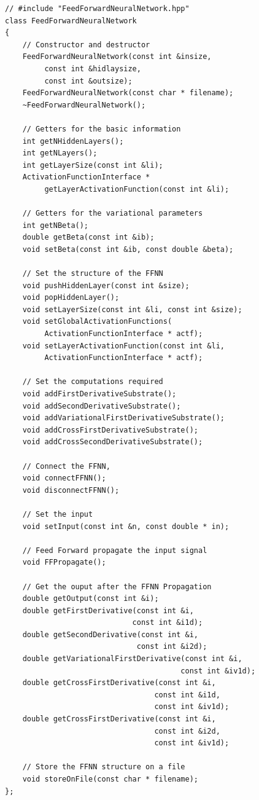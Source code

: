 \documentclass[11pt,a4paper,twoside]{article}
\begin{document}
\begin{lstlisting}
// #include "FeedForwardNeuralNetwork.hpp"
class FeedForwardNeuralNetwork
{
    // Constructor and destructor
    FeedForwardNeuralNetwork(const int &insize,
         const int &hidlaysize,
         const int &outsize);
    FeedForwardNeuralNetwork(const char * filename);
    ~FeedForwardNeuralNetwork();

    // Getters for the basic information
    int getNHiddenLayers();
    int getNLayers();
    int getLayerSize(const int &li);
    ActivationFunctionInterface *
         getLayerActivationFunction(const int &li);

    // Getters for the variational parameters
    int getNBeta();
    double getBeta(const int &ib);
    void setBeta(const int &ib, const double &beta);

    // Set the structure of the FFNN
    void pushHiddenLayer(const int &size);
    void popHiddenLayer();
    void setLayerSize(const int &li, const int &size);
    void setGlobalActivationFunctions(
         ActivationFunctionInterface * actf);
    void setLayerActivationFunction(const int &li,
         ActivationFunctionInterface * actf);

    // Set the computations required
    void addFirstDerivativeSubstrate();
    void addSecondDerivativeSubstrate();
    void addVariationalFirstDerivativeSubstrate();
    void addCrossFirstDerivativeSubstrate();
    void addCrossSecondDerivativeSubstrate();

    // Connect the FFNN,
    void connectFFNN();
    void disconnectFFNN();

    // Set the input
    void setInput(const int &n, const double * in);

    // Feed Forward propagate the input signal
    void FFPropagate();

    // Get the ouput after the FFNN Propagation
    double getOutput(const int &i);
    double getFirstDerivative(const int &i,
                             const int &i1d);
    double getSecondDerivative(const int &i,
                              const int &i2d);
    double getVariationalFirstDerivative(const int &i,
                                        const int &iv1d);
    double getCrossFirstDerivative(const int &i,
                                  const int &i1d,
                                  const int &iv1d);
    double getCrossFirstDerivative(const int &i,
                                  const int &i2d,
                                  const int &iv1d);

    // Store the FFNN structure on a file
    void storeOnFile(const char * filename);
};
\end{lstlisting}
\end{document}
